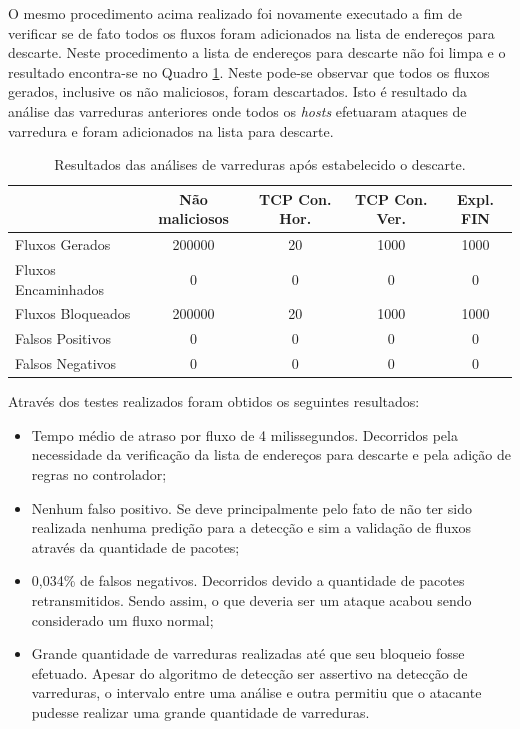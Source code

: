 O mesmo procedimento acima realizado foi novamente executado a fim de verificar se de fato todos os fluxos foram adicionados na lista de endereços para descarte. Neste procedimento a lista de endereços para descarte não foi limpa e o resultado encontra-se no Quadro \ref{fig:e2}. Neste pode-se observar que todos os fluxos gerados, inclusive os não maliciosos, foram descartados. Isto é resultado da análise das varreduras anteriores onde todos os \textit{hosts} efetuaram ataques de varredura e foram adicionados na lista para descarte.

\begin{table}[H]
\centering
\caption{Resultados das análises de varreduras após estabelecido o descarte.}
\label{fig:e2}
\begin{tabular}{|l|c|c|c|c|}
\hline
\multicolumn{1}{|c|}{} & Não maliciosos & TCP Con. Hor. & TCP Con. Ver. & Expl. FIN \\ \hline
Fluxos Gerados         & 200000          & 20      & 1000     & 1000     \\ \hline
Fluxos Encaminhados    & 0               & 0      & 0      & 0        \\ \hline
Fluxos Bloqueados      & 200000         & 20       & 1000      & 1000     \\ \hline
Falsos Positivos       & 0              & 0       & 0        & 0        \\ \hline
Falsos Negativos       & 0              & 0       & 0       & 0        \\ \hline
\end{tabular}
\end{table}

Através dos testes realizados foram obtidos os seguintes resultados:
\begin{itemize}
    \item Tempo médio de atraso por fluxo de 4 milissegundos. Decorridos pela necessidade da verificação da lista de endereços para descarte e pela adição de regras no controlador;
    \item Nenhum falso positivo. Se deve principalmente pelo fato de não ter sido realizada nenhuma predição para a detecção e sim a validação de fluxos através da quantidade de pacotes;
    \item 0,034\% de falsos negativos. Decorridos devido a quantidade de pacotes retransmitidos. Sendo assim, o que deveria ser um ataque acabou sendo considerado um fluxo normal;
    \item Grande quantidade de varreduras realizadas até que seu bloqueio fosse efetuado. Apesar do algoritmo de detecção ser assertivo na detecção de varreduras, o intervalo entre uma análise e outra permitiu que o atacante pudesse realizar uma grande quantidade de varreduras.
\end{itemize}

